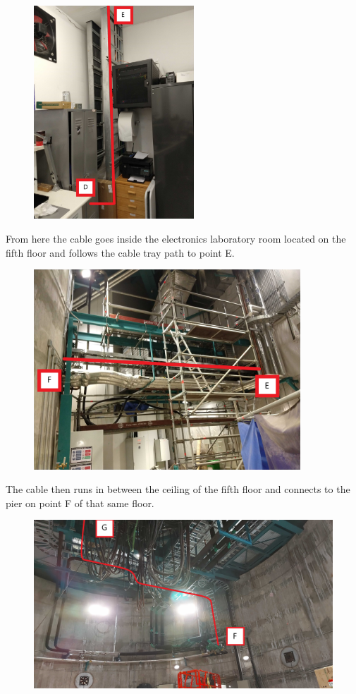   
\newpage

\begin{figure}
  \centering
  \includegraphics[width=6cm]{images/17.jpg}
\end{figure}

From here the cable goes inside the electronics laboratory room located on the fifth floor and follows the cable tray path to point E.

\begin{figure}
  \centering
  \includegraphics[width=10cm]{images/18.jpg}
\end{figure}

The cable then runs in between the ceiling of the fifth floor and connects to the pier on point F of that same floor.

\begin{figure}
  \centering
  \includegraphics[width=20cm]{images/19-1.jpg}
\end{figure}
  
